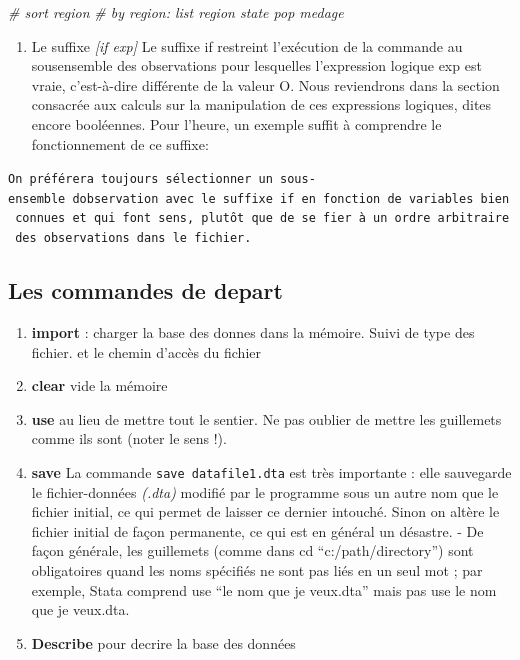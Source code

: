 \documentclass[
]{book}
\newenvironment{Shaded}{\begin{snugshade}}{\end{snugshade}}
\newcommand{\CommentTok}[1]{\textcolor[rgb]{0.56,0.35,0.01}{\textit{#1}}}
\providecommand{\tightlist}{%
  \setlength{\itemsep}{0pt}\setlength{\parskip}{0pt}}
\theoremstyle{definition}
\theoremstyle{definition}
\theoremstyle{definition}
\theoremstyle{definition}
\theoremstyle{remark}
\begin{document}
\begin{Shaded}
\begin{Highlighting}[]
\CommentTok{\# sort region}
\CommentTok{\# by region: list region state pop medage}
\end{Highlighting}
\end{Shaded}

\begin{enumerate}
\def\labelenumi{(\alph{enumi})}
\setcounter{enumi}{1}
\tightlist
\item
  Le suffixe \emph{{[}if exp{]}}
  Le suffixe if restreint l'exécution de la commande au sousensemble
  des observations pour lesquelles l'expression logique
  exp est vraie, c'est-à-dire différente de la valeur O.
  Nous reviendrons dans la section consacrée aux calculs sur la
  manipulation de ces expressions logiques, dites encore
  booléennes. Pour l'heure, un exemple suffit à comprendre le
  fonctionnement de ce suffixe:
\end{enumerate}

\texttt{On\ préférera\ toujours\ sélectionner\ un\ sous-ensemble\ d\textquotesingle{}observation\ avec\ le\ suffixe\ if\ en\ fonction\ de\ variables\ bien\ connues\ et\ qui\ font\ sens,\ plutôt\ que\ de\ se\ fier\ à\ un\ ordre\ arbitraire\ des\ observations\ dans\ le\ fichier.}

\hypertarget{les-commandes-de-depart}{%
\subsection{Les commandes de depart}\label{les-commandes-de-depart}}

\begin{enumerate}
\def\labelenumi{(\arabic{enumi})}
\tightlist
\item
  \textbf{import} : charger la base des donnes dans la mémoire. Suivi de type des fichier. et le chemin d'accès du fichier
\item
  \textbf{clear} vide la mémoire
\item
  \textbf{use} au lieu de mettre tout le sentier. Ne pas oublier de mettre les guillemets comme ils sont (noter le sens !).
\item
  \textbf{save} La commande \texttt{save\ datafile1.dta} est très importante : elle sauvegarde le fichier-données \emph{(.dta)} modifié par le programme sous un autre nom que le fichier initial, ce qui permet de laisser ce dernier intouché. Sinon on altère le fichier initial de façon permanente, ce qui est en général un désastre. - De façon générale, les guillemets (comme dans cd ``c:/path/directory'') sont obligatoires quand les noms spécifiés ne sont pas liés en un seul mot ; par exemple, Stata comprend use ``le nom que je veux.dta'' mais pas use le nom que je veux.dta.
\item
  \textbf{Describe} pour decrire la base des données
\end{enumerate}
\end{document}
